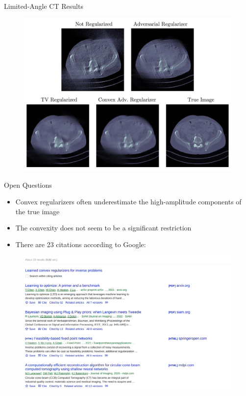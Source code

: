 \documentclass{beamer}
\begin{document}
\begin{frame}{Limited-Angle CT Results}
  \begin{center}
    \begin{figure}
      \includegraphics[width=.9\textwidth]{../figures/results-final.pdf}
    \end{figure}
  \end{center}
\end{frame}

\begin{frame}{Open Questions}
\begin{itemize}
\item Convex regularizers often underestimate the high-amplitude components of the true image
\item The convexity does not seem to be a significant restriction
\item There are 23 citations according to Google:
\end{itemize}
\begin{center}
\begin{figure}
\includegraphics[width=.7\textwidth]{../figures/citations.png}
\end{figure}
\end{center}
\end{frame}
\end{document}
